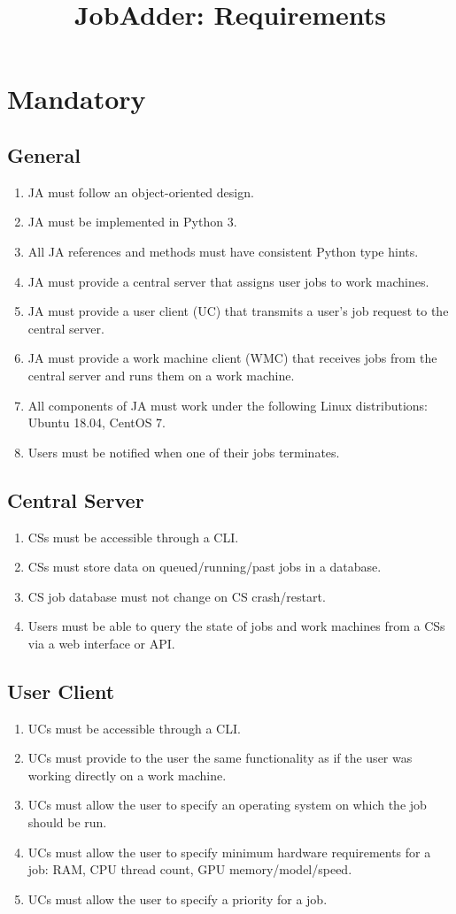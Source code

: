 \documentclass[a4paper,10pt]{article}
\title{JobAdder: Requirements}
\author{}
\begin{document}
\maketitle

\section{Mandatory}
\subsection{General}
\begin{enumerate}
 \item JA must follow an object-oriented design.
 \item JA must be implemented in Python 3.
 \item All JA references and methods must have consistent Python type hints.
 \item JA must provide a central server that assigns user jobs to work machines.
 \item JA must provide a user client (UC) that transmits a user's job request to the central server.
 \item JA must provide a work machine client (WMC) that receives jobs from the central server and runs them on a work machine.
 \item All components of JA must work under the following Linux distributions: Ubuntu 18.04, CentOS 7.
 \item Users must be notified when one of their jobs terminates.
\end{enumerate}
\subsection{Central Server}
\begin{enumerate}
 \item CSs must be accessible through a CLI.
 \item CSs must store data on queued/running/past jobs in a database.
 \item CS job database must not change on CS crash/restart.
 \item Users must be able to query the state of jobs and work machines from a CSs via a web interface or API.
\end{enumerate}
\subsection{User Client}
\begin{enumerate}
 \item UCs must be accessible through a CLI.
 \item UCs must provide to the user the same functionality as if the user was working directly on a work machine.
 \item UCs must allow the user to specify an operating system on which the job should be run.
 \item UCs must allow the user to specify minimum hardware requirements for a job: RAM, CPU thread count, GPU memory/model/speed.
 \item UCs must allow the user to specify a priority for a job.
\end{enumerate}
\end{document}
